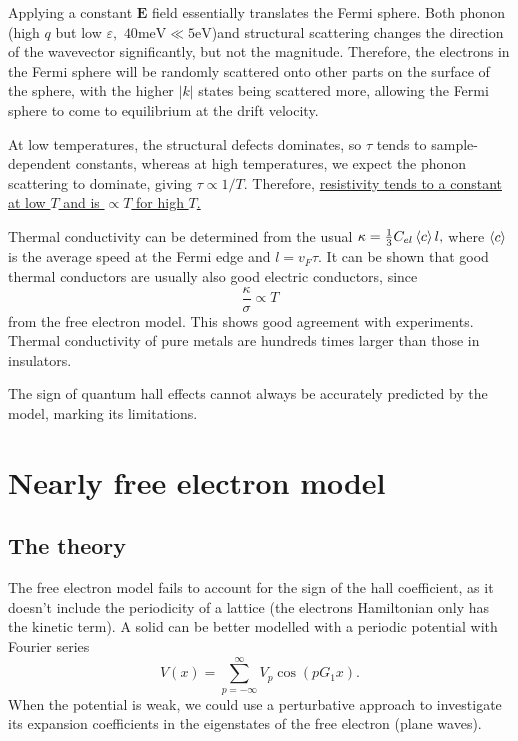 \documentclass{article}
\theoremstyle{nonumberplain}
\begin{document}
Applying a constant $\mathbf{E} $ field essentially translates the Fermi sphere. Both phonon (high $q$ but low $\varepsilon,$ $40\mathrm{meV} \ll 5\mathrm{eV} $)and structural scattering changes the direction of the wavevector significantly, but not the magnitude. Therefore, the electrons in the Fermi sphere will be randomly scattered onto other parts on the surface of the sphere, with the higher $\left\vert k \right\vert $ states being scattered more, allowing the Fermi sphere to come to equilibrium at the drift velocity. 

At low temperatures, the structural defects dominates, so $\tau$ tends to sample-dependent constants, whereas at high temperatures, we expect the phonon scattering to dominate, giving $\tau \propto 1/T.$ Therefore, \underline{resistivity tends to a constant at low $T$ and is $\propto T$ for high $T$.}

Thermal conductivity can be determined from the usual \(\kappa  = \frac{1}{3} C_{el} \expval{c} l,\) where $\expval{c}$ is the average speed at the Fermi edge and $l = v_F \tau.$ It can be shown that good thermal conductors are usually also good electric conductors, since
\[
    \frac{\kappa }{\sigma } \propto T
\]
from the free electron model. This shows good agreement with experiments. Thermal conductivity of pure metals are hundreds times larger than those in insulators. 

The sign of quantum hall effects cannot always be accurately predicted by the model, marking its limitations.

\section{Nearly free electron model}
\subsection{The theory}
The free electron model fails to account for the sign of the hall coefficient, as it doesn't include the periodicity of a lattice (the electrons Hamiltonian only has the kinetic term). A solid can be better modelled with a periodic potential with Fourier series
\[
    V(x) = \sum_{p=-\infty }^{\infty} V_p \cos(p G_1 x). 
\]
When the potential is weak, we could use a perturbative approach to investigate its expansion coefficients in the eigenstates of the free electron (plane waves).
\end{document}
